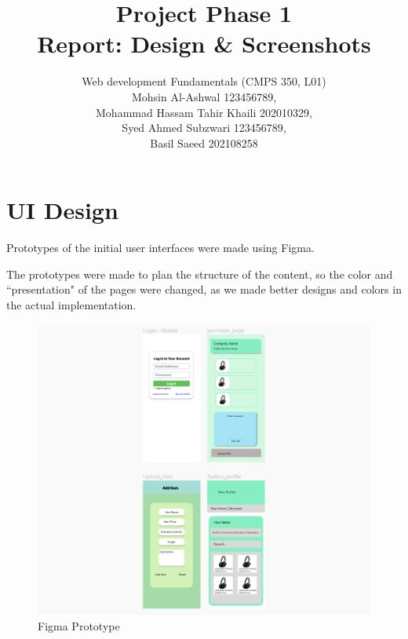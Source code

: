 \documentclass[12pt, a4paper]{article}   %
\begin{document}
\doublespacing

\title{Project Phase 1\\Report: Design \& Screenshots}   %
\author{Web development Fundamentals (CMPS 350, L01) \\\vspace{-1.5ex} Mohsin Al-Ashwal 123456789, \\\vspace{-1.5ex} Mohammad Hassam Tahir Khaili 202010329, \\\vspace{-1.5ex}Syed Ahmed Subzwari 123456789, \\ Basil Saeed 202108258}         %
\maketitle
\tableofcontents
\break

\section{UI Design}             %
Prototypes of the initial user interfaces were made using Figma.

The prototypes were made to plan the structure of the content, so the color and ``presentation" of the pages were changed, as we made better designs and colors in the actual implementation.

\begin{figure}[h]
\begin{center}
\includegraphics[width=120mm]{figmaSample.PNG}
\caption{Figma Prototype}
\end{center}
\end{figure}
\end{document}
